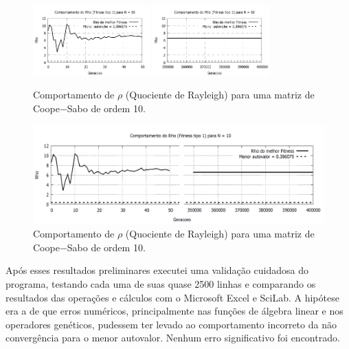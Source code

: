 	\begin{figure}[htbp]
		\centering
			\includegraphics[width=0.40\textwidth]{figs/resultados/rho_N10_g50.pdf}
			\includegraphics[width=0.40\textwidth]{figs/resultados/rho_N10_g400000.pdf}
		\caption{Comportamento de $\rho$ (Quociente de Rayleigh) para uma matriz de Coope$-$Sabo de ordem 10.}
		\label{fig:rho_N10}
	\end{figure}
	
	\newpage
	\begin{landscape}
	\begin{figure}[p]
		\centering
			\includegraphics[width=1.3\textwidth]{figs/resultados/rho_N10.png}
		\caption{Comportamento de $\rho$ (Quociente de Rayleigh) para uma matriz de Coope$-$Sabo de ordem 10.}
		\label{fig:rho_N10_completa}
	\end{figure}
	\end{landscape}
	\newpage
			
	Após esses resultados preliminares executei uma validação cuidadosa do programa, testando cada uma de suas quase 2500 linhas e comparando os resultados das operações e cálculos com o Microsoft Excel e SciLab. A hipótese era a de que erros numéricos, principalmente nas funções de álgebra linear e nos operadores genéticos, pudessem ter levado ao comportamento incorreto da não convergência para o menor autovalor. Nenhum erro significativo foi encontrado.
	
